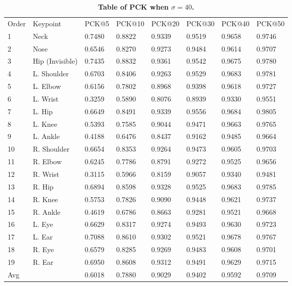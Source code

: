 \documentclass[10pt,letterpaper]{article}
\newlength\savedwidth
\newcommand\thickhline{\noalign{\global\savedwidth\arrayrulewidth\global\arrayrulewidth 2pt}%
	\hline
	\noalign{\global\arrayrulewidth\savedwidth}}
\begin{document}
\begin{table}[!ht]
	\begin{adjustwidth}{-2.25in}{0in} %
		\centering
		\caption{
			{\bf Table of PCK when $\sigma=40$.}}
		\begin{tabular}{|l|l|l|l|l|l|l|l|}
			\hline
			Order & Keypoint & PCK@5 & PCK@10 & PCK@20 & PCK@30 & PCK@40 & PCK@50 \\ \thickhline
			1     &  Neck    & 0.7480 & 0.8822 & 0.9339 & 0.9519 & 0.9658 & 0.9746      \\ \hline
			2     &  Nose     & 0.6546 & 0.8270 & 0.9273 & 0.9484 & 0.9614 & 0.9707       \\ \hline
			3     &  Hip (Invisible)     & 0.7435 & 0.8832 & 0.9361 & 0.9542 & 0.9675 & 0.9780      \\ \hline
			4     &  L. Shoulder      & 0.6703 & 0.8406 & 0.9263 & 0.9529 & 0.9683 & 0.9781      \\ \hline
			5     &  L. Elbow      & 0.6156 & 0.7802 & 0.8968 & 0.9398 & 0.9618 & 0.9727     \\ \hline
			6     &  L. Wrist     & 0.3259 & 0.5890 & 0.8076 & 0.8939 & 0.9330 & 0.9551      \\ \hline
			7     &  L. Hip     & 0.6649 & 0.8491 & 0.9339 & 0.9556 & 0.9684 & 0.9805      \\ \hline
			8     &  L. Knee      & 0.5393 & 0.7585 & 0.9044 & 0.9471 & 0.9663 & 0.9765      \\ \hline
			9     &  L. Ankle      & 0.4188 & 0.6476 & 0.8437 & 0.9162 & 0.9485 & 0.9664      \\ \hline
			10    &  R. Shoulder     & 0.6654 & 0.8353 & 0.9264 & 0.9473 & 0.9605 & 0.9703      \\ \hline
			11    &  R. Elbow     & 0.6245 & 0.7786 & 0.8791 & 0.9272 & 0.9525 & 0.9656      \\ \hline
			12    &  R. Wrist     & 0.3115 & 0.5966 & 0.8159 & 0.9057 & 0.9340 & 0.9481      \\ \hline
			13    &  R. Hip     & 0.6894 & 0.8598 & 0.9328 & 0.9525 & 0.9683 & 0.9785      \\ \hline
			14    &  R. Knee     & 0.5753 & 0.7826 & 0.9090 & 0.9448 & 0.9621 & 0.9737      \\ \hline
			15    &  R. Ankle     & 0.4619 & 0.6786 & 0.8663 & 0.9281 & 0.9521 & 0.9668      \\ \hline
			16    &  L. Eye     & 0.6629 & 0.8317 & 0.9274 & 0.9493 & 0.9630 & 0.9723      \\ \hline
			17    &  L. Ear     & 0.7088 & 0.8610 & 0.9302 & 0.9521 & 0.9678 & 0.9767      \\ \hline
			18    &  R. Eye     & 0.6579 & 0.8285 & 0.9269 & 0.9483 & 0.9608 & 0.9701      \\ \hline
			19    &  R. Ear     & 0.6950 & 0.8608 & 0.9312 & 0.9491 & 0.9629 & 0.9715      \\ \hline
			Avg  &  &    0.6018 & 0.7880 & 0.9029 & 0.9402 & 0.9592 & 0.9709        \\ \hline
		\end{tabular}
		\label{table:PCKsigma40}
	\end{adjustwidth}
\end{table}
\end{document}
